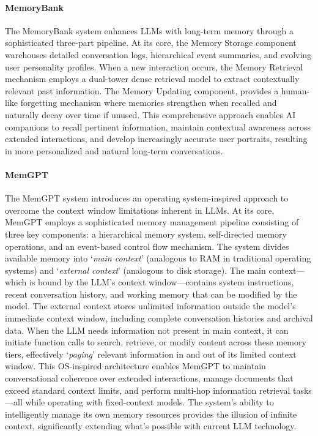\paragraph{MemoryBank} The MemoryBank system enhances LLMs with long-term memory through a sophisticated three-part pipeline. At its core, the Memory Storage component warehouses detailed conversation logs, hierarchical event summaries, and evolving user personality profiles. When a new interaction occurs, the Memory Retrieval mechanism employs a dual-tower dense retrieval model to extract contextually relevant past information. The Memory Updating component, provides a human-like forgetting mechanism where memories strengthen when recalled and naturally decay over time if unused. This comprehensive approach enables AI companions to recall pertinent information, maintain contextual awareness across extended interactions, and develop increasingly accurate user portraits, resulting in more personalized and natural long-term conversations.

\paragraph{MemGPT} The MemGPT system introduces an operating system-inspired approach to overcome the context window limitations inherent in LLMs. At its core, MemGPT employs a sophisticated memory management pipeline consisting of three key components: a hierarchical memory system, self-directed memory operations, and an event-based control flow mechanism. The system divides available memory into `\textit{main context}' (analogous to RAM in traditional operating systems) and `\textit{external context}' (analogous to disk storage). The main context—which is bound by the LLM's context window—contains system instructions, recent conversation history, and working memory that can be modified by the model. The external context stores unlimited information outside the model's immediate context window, including complete conversation histories and archival data. When the LLM needs information not present in main context, it can initiate function calls to search, retrieve, or modify content across these memory tiers, effectively `\textit{paging}' relevant information in and out of its limited context window. This OS-inspired architecture enables MemGPT to maintain conversational coherence over extended interactions, manage documents that exceed standard context limits, and perform multi-hop information retrieval tasks—all while operating with fixed-context models. The system's ability to intelligently manage its own memory resources provides the illusion of infinite context, significantly extending what's possible with current LLM technology.


